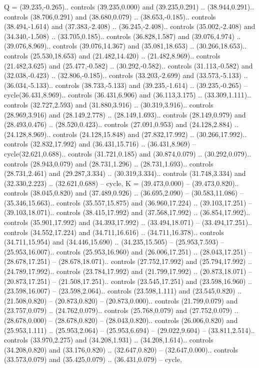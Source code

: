 {Q} = {(39.235,-0.265).. controls (39.235,0.000) and (39.235,0.291) .. (38.944,0.291).. controls (38.706,0.291) and (38.680,0.079) .. (38.653,-0.185).. controls (38.494,-1.614) and (37.383,-2.408) .. (36.245,-2.408).. controls (35.002,-2.408) and (34.340,-1.508) .. (33.705,0.185).. controls (36.828,1.587) and (39.076,4.974) .. (39.076,8.969).. controls (39.076,14.367) and (35.081,18.653) .. (30.266,18.653).. controls (25.530,18.653) and (21.482,14.420) .. (21.482,8.969).. controls (21.482,3.625) and (25.477,-0.582) .. (30.292,-0.582).. controls (31.113,-0.582) and (32.038,-0.423) .. (32.806,-0.185).. controls (33.203,-2.699) and (33.573,-5.133) .. (36.034,-5.133).. controls (38.733,-5.133) and (39.235,-1.614) .. (39.235,-0.265) -- cycle(36.431,8.969).. controls (36.431,6.906) and (36.113,3.175) .. (33.309,1.111).. controls (32.727,2.593) and (31.880,3.916) .. (30.319,3.916).. controls (28.969,3.916) and (28.149,2.778) .. (28.149,1.693).. controls (28.149,0.979) and (28.493,0.476) .. (28.520,0.423).. controls (27.091,0.953) and (24.128,2.884) .. (24.128,8.969).. controls (24.128,15.848) and (27.832,17.992) .. (30.266,17.992).. controls (32.832,17.992) and (36.431,15.716) .. (36.431,8.969) -- cycle(32.621,0.688).. controls (31.721,0.185) and (30.874,0.079) .. (30.292,0.079).. controls (28.943,0.079) and (28.731,1.296) .. (28.731,1.693).. controls (28.731,2.461) and (29.287,3.334) .. (30.319,3.334).. controls (31.748,3.334) and (32.330,2.223) .. (32.621,0.688) -- cycle},
{K} = {(39.473,0.000) -- (39.473,0.820).. controls (38.045,0.820) and (37.489,0.926) .. (36.695,2.090) -- (30.583,11.086) -- (35.346,15.663).. controls (35.557,15.875) and (36.960,17.224) .. (39.103,17.251) -- (39.103,18.071).. controls (38.415,17.992) and (37.568,17.992) .. (36.854,17.992).. controls (35.901,17.992) and (34.393,17.992) .. (33.494,18.071) -- (33.494,17.251).. controls (34.552,17.224) and (34.711,16.616) .. (34.711,16.378).. controls (34.711,15.954) and (34.446,15.690) .. (34.235,15.505) -- (25.953,7.593) -- (25.953,16.007).. controls (25.953,16.960) and (26.006,17.251) .. (28.043,17.251) -- (28.678,17.251) -- (28.678,18.071).. controls (27.752,17.992) and (25.794,17.992) .. (24.789,17.992).. controls (23.784,17.992) and (21.799,17.992) .. (20.873,18.071) -- (20.873,17.251) -- (21.508,17.251).. controls (23.545,17.251) and (23.598,16.960) .. (23.598,16.007) -- (23.598,2.064).. controls (23.598,1.111) and (23.545,0.820) .. (21.508,0.820) -- (20.873,0.820) -- (20.873,0.000).. controls (21.799,0.079) and (23.757,0.079) .. (24.762,0.079).. controls (25.768,0.079) and (27.752,0.079) .. (28.678,0.000) -- (28.678,0.820) -- (28.043,0.820).. controls (26.006,0.820) and (25.953,1.111) .. (25.953,2.064) -- (25.953,6.694) -- (29.022,9.604) -- (33.811,2.514).. controls (33.970,2.275) and (34.208,1.931) .. (34.208,1.614).. controls (34.208,0.820) and (33.176,0.820) .. (32.647,0.820) -- (32.647,0.000).. controls (33.573,0.079) and (35.425,0.079) .. (36.431,0.079) -- cycle},
